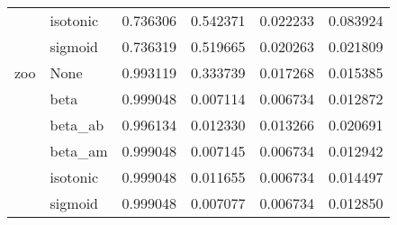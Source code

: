 \begin{tabular}{llrrrr}
        & isotonic &  0.736306 &  0.542371 &  0.022233 &  0.083924 \\
        & sigmoid &  0.736319 &  0.519665 &  0.020263 &  0.021809 \\
zoo & None &  0.993119 &  0.333739 &  0.017268 &  0.015385 \\
        & beta &  0.999048 &  0.007114 &  0.006734 &  0.012872 \\
        & beta\_ab &  0.996134 &  0.012330 &  0.013266 &  0.020691 \\
        & beta\_am &  0.999048 &  0.007145 &  0.006734 &  0.012942 \\
        & isotonic &  0.999048 &  0.011655 &  0.006734 &  0.014497 \\
        & sigmoid &  0.999048 &  0.007077 &  0.006734 &  0.012850 \\
\bottomrule
\end{tabular}
